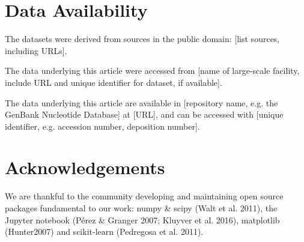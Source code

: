 \documentclass[usenatbib]{mnras}
\begin{document}
\section*{Data Availability}

The datasets were derived from sources in the public domain: [list sources, including URLs].

The data underlying this article were accessed from [name of large-scale facility, include URL and unique identifier for dataset, if available].

The data underlying this article are available in [repository name, e.g. the GenBank Nucleotide Database] at [URL], and can be accessed with [unique identifier, e.g. accession number, deposition number].

\section*{Acknowledgements}

We are thankful to the community developing and maintaining open source packages fundamental to our work: numpy
\&  scipy  (Walt  et  al.  2011),  the  Jupyter  notebook  (P\'erez \& Granger 2007; Kluyver et al. 2016), matplotlib (Hunter2007) and  scikit-learn (Pedregosa et al. 2011).






\bsp	%
\label{lastpage}
\end{document}

